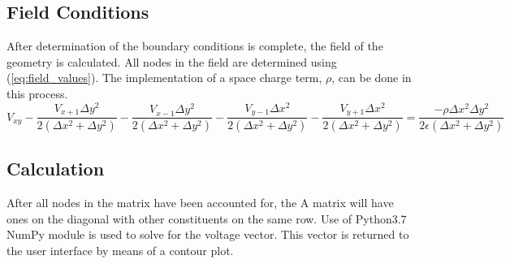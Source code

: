 \documentclass{article}[12pt]
\begin{document}
\subsection{Field Conditions}
	After determination of the boundary conditions is complete, the field of the geometry is calculated. All nodes in the field are determined using (\ref{eq:field_values}).  The implementation of a space charge term, $\rho$, can be done in this process. 
	\begin{equation}
		V_{xy}-\frac{V_{x+1}\Delta y^2}{2\left(\Delta x^2+\Delta y^2\right)}-\frac{V_{x-1}\Delta y^2}{2\left(\Delta x^2+\Delta y^2\right)}-\frac{V_{y-1}\Delta x^2}{2\left(\Delta  x^2+\Delta y^2\right)}-\frac{V_{y+1}\Delta x^2}{2\left(\Delta  x^2+\Delta y^2\right)}=\frac{-\rho \Delta  x^2 \Delta y^2}{2\epsilon\left(\Delta x^2+\Delta y^2\right)}
		\label{eq:field_values}
	\end{equation}
\subsection{Calculation}
	After all nodes in the matrix have been accounted for, the A matrix will have ones on the diagonal with other constituents on the same row. Use of Python3.7 NumPy module is used to solve for the voltage vector. This vector is returned to the user interface by means of a contour plot.
\end{document}
